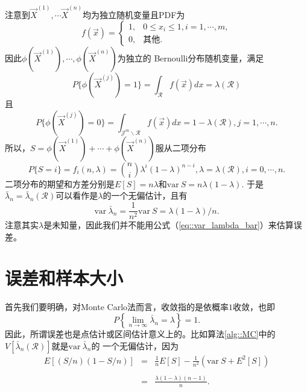 注意到$\vec{X}^{(1)}, \cdots \vec{X}^{(n)}$均为独立随机变量且PDF为
\begin{equation}
  f(\vec{x}) = \left\{
  \begin{array}{ll}
    1, & 0 \leq x_i \leq 1, i = 1, \cdots, m,\\
    0, & \mbox{其他}.
  \end{array}
  \right.
  \label{eq::MC_X_PDF}
\end{equation}
因此$\phi(\vec{X}^{(1)}), \cdots, \phi(\vec{X}^{(n)})$为独立的
Bernoulli分布随机变量，满足
\begin{equation}
  P\{\phi(\vec{X}^{(j)}) = 1\} = \int_{\mathscr{R}} f(\vec{x}) dx =
  \lambda(\mathscr{R})
  \label{eq::MC_phi_X}
\end{equation}
且
\begin{equation}
  P\{\phi(\vec{X}^{(j)}) = 0\} = \int_{\mathscr{J}^m \backslash
    \mathscr{R}} f(\vec{x}) dx = 1 - \lambda(\mathscr{R}), j = 1, \cdots, n.
  \label{eq::MC_phi_X_R}
\end{equation}
所以，$S = \phi(\vec{X}^{(1)}) + \cdots + \phi(\vec{X}^{(n)})$服从二项分布
\begin{equation}
  P\{S = i\} = f_i(n, \lambda) = \binom{n}{i} \lambda^i (1 -
  \lambda)^{n - i}, \lambda = \lambda(\mathscr{R}), i = 0, \cdots, n.
  \label{eq::MC_Bernoulli}
\end{equation}
二项分布的期望和方差分别是$E[S] = n \lambda$和$\mathrm{var~} S =
n\lambda(1 - \lambda)$. 于是$\bar{\lambda}_n =
\bar{\lambda}_n(\mathscr{R})$可以看作是$\lambda$的一个无偏估计，且有
\begin{equation}
  \mathrm{var~} \bar{\lambda}_n = \frac{1}{n^2} \mathrm{var~} S =
  \lambda (1 - \lambda) / n.
  \label{eq::var_lambda_bar}
\end{equation}
注意其实$\lambda$是未知量，因此我们并不能用公式（\ref{eq::var_lambda_bar}）来估算误差。

\section{误差和样本大小}

首先我们要明确，对Monte Carlo法而言，收敛指的是依概率$1$收敛，也即
\begin{equation}
  P\left\{\lim_{n \to \infty} \bar{\lambda}_n = \lambda \right\} = 1.
\end{equation}
因此，所谓误差也是点估计或区间估计意义上的。比如算法\ref{alg::MC}中的
$V[\bar{\lambda}_n(\mathscr{R})]$就是$\mathrm{var~} \bar{\lambda}_n$的
一个无偏估计，因为
\begin{equation}
  \begin{array}{rcl}
  E[(S / n) (1 - S / n)] &=&  \displaystyle \frac{1}{n} E[S] -
  \frac{1}{n^2}(\mathrm{var~} S + E^2[S])\\\\
  &=& \displaystyle\frac{\lambda (1 - \lambda) (n - 1)}{n}.
 \end{array}
\end{equation}


